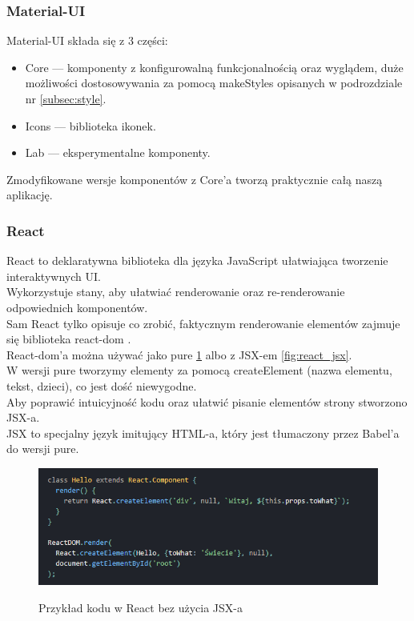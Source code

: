 \documentclass[a4paper,11pt]{report}
\begin{document}
\subsubsection{Material-UI}
\label{subsec:mui}
Material-UI\cite{material-ui} składa się z 3 części:
\begin{itemize}
	\item Core — komponenty z konfigurowalną funkcjonalnością oraz wyglądem,
		duże możliwości dostosowywania za pomocą makeStyles opisanych w podrozdziale nr \ref{subsec:style}.
	\item Icons — biblioteka ikonek.
	\item Lab — eksperymentalne komponenty.
\end{itemize}
Zmodyfikowane wersje komponentów z Core'a tworzą praktycznie całą naszą aplikację.

\subsubsection{React}
\label{subsec:react}
React\cite{react} to deklaratywna biblioteka dla języka JavaScript ułatwiająca tworzenie interaktywnych UI.\\
 Wykorzystuje stany, aby ułatwiać renderowanie oraz re-renderowanie odpowiednich komponentów.\\
 Sam React tylko opisuje co zrobić, faktycznym renderowanie elementów zajmuje się biblioteka react-dom \cite{react-dom}.\\
 React-dom'a można używać jako pure \ref{fig:react_no_jsx} albo z JSX-em \ref{fig:react_jsx}.\\
 W wersji pure tworzymy elementy za pomocą createElement (nazwa elementu, tekst, dzieci), co jest dość niewygodne.\\
 Aby poprawić intuicyjność kodu oraz ułatwić pisanie elementów strony stworzono JSX-a.\\
 JSX to specjalny język imitujący HTML-a, który jest tłumaczony przez Babel'a do wersji pure.\\
 \begin{figure}[H]
	\centering
	\includegraphics[scale=0.5]{implementacja/frontend/react_no_jsx}\\
	\caption{Przykład kodu w React bez użycia JSX-a}
	\label{fig:react_no_jsx}
\end{figure}
\end{document}
